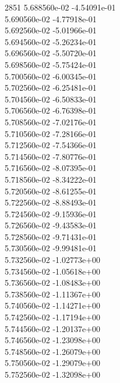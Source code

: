 2851	5.688560e-02	-4.54091e-01	\\ 	5.690560e-02	-4.77918e-01	\\ 	5.692560e-02	-5.01966e-01	\\ 	5.694560e-02	-5.26234e-01	\\ 	5.696560e-02	-5.50720e-01	\\ 	5.698560e-02	-5.75424e-01	\\ 	5.700560e-02	-6.00345e-01	\\ 	5.702560e-02	-6.25481e-01	\\ 	5.704560e-02	-6.50833e-01	\\ 	5.706560e-02	-6.76398e-01	\\ 	5.708560e-02	-7.02176e-01	\\ 	5.710560e-02	-7.28166e-01	\\ 	5.712560e-02	-7.54366e-01	\\ 	5.714560e-02	-7.80776e-01	\\ 	5.716560e-02	-8.07395e-01	\\ 	5.718560e-02	-8.34222e-01	\\ 	5.720560e-02	-8.61255e-01	\\ 	5.722560e-02	-8.88493e-01	\\ 	5.724560e-02	-9.15936e-01	\\ 	5.726560e-02	-9.43583e-01	\\ 	5.728560e-02	-9.71431e-01	\\ 	5.730560e-02	-9.99481e-01	\\ 	5.732560e-02	-1.02773e+00	\\ 	5.734560e-02	-1.05618e+00	\\ 	5.736560e-02	-1.08483e+00	\\ 	5.738560e-02	-1.11367e+00	\\ 	5.740560e-02	-1.14271e+00	\\ 	5.742560e-02	-1.17194e+00	\\ 	5.744560e-02	-1.20137e+00	\\ 	5.746560e-02	-1.23098e+00	\\ 	5.748560e-02	-1.26079e+00	\\ 	5.750560e-02	-1.29079e+00	\\ 	5.752560e-02	-1.32098e+00	\\ \hline
